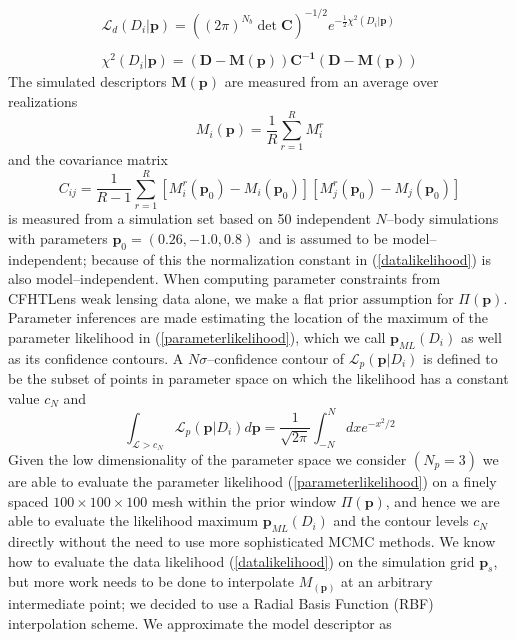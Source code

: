 \documentclass[reprint,aps,prd,superscriptaddress,showkeys]{revtex4-1}
\begin{document}
\begin{equation}
\label{datalikelihood}
\begin{matrix}
\mathcal{L}_d(D_i\vert \mathbf{p}) = ((2\pi)^{N_b}\det{\mathbf{C}})^{-1/2} e^{-\frac{1}{2}\chi^2(D_i\vert \mathbf{p})} \\ \\
\chi^2(D_i\vert \mathbf{p}) = \mathbf{(D - M(p))C^{-1}(D-M(p))}
\end{matrix}
\end{equation} 
%
The simulated descriptors $\mathbf{M(p)}$ are measured from an average over realizations
\begin{equation}
M_i(\mathbf{p}) = \frac{1}{R}\sum_{r=1}^R M_i^r 
\end{equation}
%
and the covariance matrix 
\begin{equation}
C_{ij} = \frac{1}{R-1} \sum_{r=1}^R [M_i^r(\mathbf{p}_0)-M_i(\mathbf{p}_0)][M_j^r(\mathbf{p}_0)-M_j(\mathbf{p}_0)]
\end{equation}
%
is measured from a simulation set based on 50 independent $N$--body simulations with parameters $\mathbf{p}_0=(0.26,-1.0,0.8)$ and is assumed to be model--independent; because of this the normalization constant in (\ref{datalikelihood}) is also model--independent. When computing parameter constraints from CFHTLens weak lensing data alone, we make a flat prior assumption for $\Pi(\mathbf{p})$. Parameter inferences are made estimating the location of the maximum of the parameter likelihood in (\ref{parameterlikelihood}), which we call $\mathbf{p}_{ML}(D_i)$ as well as its confidence contours. A $N\sigma$--confidence contour of $\mathcal{L}_p(\mathbf{p}\vert D_i)$ is defined to be the subset of points in parameter space on which the likelihood has a constant value $c_N$ and 
\begin{equation}
\int_{\mathcal{L}>c_N} \mathcal{L}_p(\mathbf{p}\vert D_i) d\mathbf{p} = \frac{1}{\sqrt{2\pi}}\int_{-N}^N dx e^{-x^2/2}
\end{equation}
%
Given the low dimensionality of the parameter space we consider $(N_p=3)$ we are able to evaluate the parameter likelihood (\ref{parameterlikelihood}) on a finely spaced $100\times100\times100$ mesh within the prior window $\Pi(\mathbf{p})$, and hence we are able to evaluate the likelihood maximum $\mathbf{p}_{ML}(D_i)$ and the contour levels $c_N$ directly without the need to use more sophisticated MCMC methods. We know how to evaluate the data likelihood (\ref{datalikelihood}) on the simulation grid $\mathbf{p}_s$, but more work needs to be done to interpolate $M_(\mathbf{p})$ at an arbitrary intermediate point; we decided to use a Radial Basis Function (RBF) interpolation scheme. We approximate the model descriptor as
\end{document}
